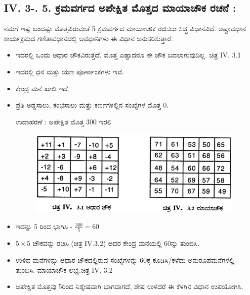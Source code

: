 \subsection*{IV. 3-. 5. ಕ್ರಮವರ್ಗದ ಅಪೇಕ್ಷಿತ ಮೊತ್ತದ ಮಾಯಾಚೌಕ ರಚನೆ :}

ನಮಗೆ ಇಷ್ಟ ಬಂದಷ್ಟು ಮೊತ್ತವಿರುವಂತೆ 5 ಕ್ರಮವರ್ಗದ ಮಾಯಾಚೌಕ ರಚಿಸಲು ಸಿದ್ಧ ವಿಧಾನವಿದೆ. ಅಷ್ಟಾವಧಾನ ಕಾರ್ಯಕ್ರಮದ ಗಣಿತಾವಧಾನದಲ್ಲಿ ಅವಧಾನಿಗಳು ಈ ವಿಧಾನ ಅನುಸರಿಸುತ್ತಾರೆ.
\begin{itemize}
	\item ಇದರಲ್ಲಿ ಒಂದು ಆಧಾರ ಚೌಕವಿರುತ್ತದೆ. ಮೊತ್ತ ಎಷ್ಟಾದರೂ ಈ ಚೌಕ ಬದಲಾಗುವುದಿಲ್ಲ. ಚಿತ್ರ IV. 3.1
	\item ಇದರಲ್ಲಿ ಧನ ಮತ್ತು ಋಣ ಪೂರ್ಣಾಂಕಗಳು ಇವೆ.
	\item ಕೇಂದ್ರ ಮನೆ ಖಾಲಿ ಇದೆ.
	\item ಪ್ರತಿ ಅಡ್ಡಸಾಲು, ಕಂಭಸಾಲು ಮತ್ತು ಕರ್ಣಗಳಲ್ಲಿನ ಸಂಖ್ಯೆಗಳ ಮೊತ್ತ 0.

	ಉದಾಹರಣೆ : ಅಪೇಕ್ಷಿತ ಮೊತ್ತ 300 ಇರಲಿ
	\begin{figure}[H]
	\includegraphics{src/figures/chap3/fig3-41.jpg}
	\end{figure}
	\item ಇದನ್ನು 5 ರಿಂದ ಭಾಗಿಸಿ - $\frac{300}{5}=60$
	\item $5 \times 5$ ಚೌಕವನ್ನು ರಚಿಸಿ (ಚಿತ್ರ IV.3.2) ಅದರ ಕೇಂದ್ರ ಮನೆಯಲ್ಲಿ 60ನ್ನು \break ತುಂಬಿಸಿ.
	\item ಉಳಿದ ಮನೆಗಳನ್ನು ಆಧಾರ ಚೌಕದಲ್ಲಿರುವ ಸಂಖ್ಯೆಗಳನ್ನು 60ಕ್ಕೆ ಕೂಡಿಸಿ/ಕಳೆದು ಅನುರೂಪಮನೆಗಳಲ್ಲಿ ತುಂಬಿಸಿ. ಮಾಯಾಚೌಕ ಲಭ್ಯ.ಚಿತ್ರ IV. 3.2
	\item ಅಪೇಕ್ಷಿತ ಮೊತ್ತವು 5ರಿಂದ ನಿಶ್ಶೇಷವಾಗಿ ಭಾಗವಾಗದೆ, ಶೇಷ ಉಳಿದರೆ ಈ ಕೆಳಗಿನ ವಿಧಾನ ಉಪಯೋಗಿಸಿ.


\end{itemize}
